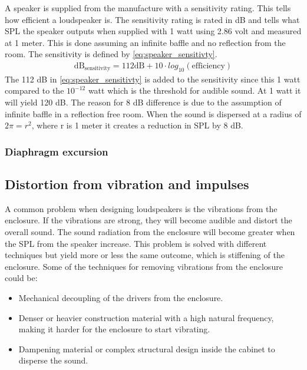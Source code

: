 A speaker is supplied from the manufacture with a sensitivity rating. This tells how efficient a loudspeaker is. The sensitivity rating is rated in dB and tells what \gls{SPL} the speaker outputs when supplied with 1 watt using 2.86 volt and measured at 1 meter. This is done assuming an infinite baffle and no reflection from the room. The sensitivity is defined by \autoref{eq:speaker_sensitivty}.
\begin{align}\label{eq:speaker_sensitivty}
\text{dB}_\text{sensitivity}=112\text {dB} +10 \cdot log_{10}(\text{efficiency})
\end{align}  
The 112 dB in \autoref{eq:speaker_sensitivty} is added to the sensitivity since this 1 watt compared to the $10^{-12}$ watt which is the threshold for audible sound. At 1 watt it will yield 120 dB. The reason for 8 dB difference is due to the assumption of infinite baffle in a reflection free room. When the sound is dispersed at a radius of $2\pi=r^2$, where r is 1 meter it creates a reduction in \gls{SPL} by 8 dB.

\subsubsection*{Diaphragm excursion}




\subsection{Distortion from vibration and impulses}

A common problem when designing loudspeakers is the vibrations from the enclosure. If the vibrations are strong, they will become audible and distort the overall sound. The sound radiation from the enclosure will become greater when the \gls{SPL} from the speaker increase. This problem is solved with different techniques but yield more or less the same outcome, which is stiffening of the enclosure. Some of the techniques for removing vibrations from the enclosure could be:
\begin{itemize}
\item Mechanical decoupling of the drivers from the enclosure.
\item Denser or heavier construction material with a high natural frequency, making it harder for the enclosure to start vibrating.
\item Dampening material or complex structural design inside the cabinet to disperse the sound.
\end{itemize}


